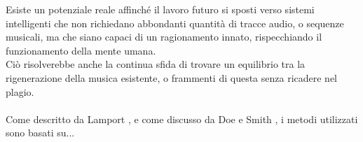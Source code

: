 \documentclass[a4paper,12pt]{report}
\begin{document}
Esiste un potenziale reale affinché il lavoro futuro si sposti verso sistemi intelligenti che non richiedano abbondanti quantità di tracce audio, o sequenze musicali, 
ma che siano capaci di un ragionamento innato, rispecchiando il funzionamento della mente umana. \\
Ciò risolverebbe anche la continua sfida di trovare un equilibrio tra la rigenerazione della musica esistente, o frammenti di questa senza ricadere nel plagio. \\
\\
Come descritto da Lamport \cite{latex}, e come discusso da Doe e Smith \cite{example_article}, i metodi utilizzati sono basati su...



\end{document}
